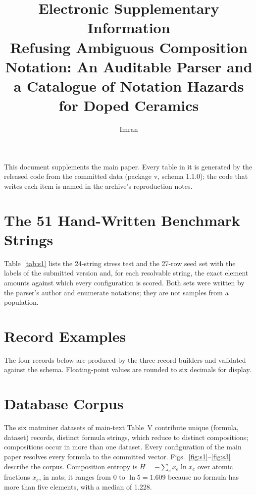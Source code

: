 \documentclass[10pt,a4paper]{article}
\title{Electronic Supplementary Information\\[4pt]\large Refusing Ambiguous Composition Notation: An Auditable Parser and a Catalogue of Notation Hazards for Doped Ceramics}
\author{Imran}
\date{}
\begin{document}
\maketitle

\noindent This document supplements the main paper. Every table in it is generated by the released code from the committed data (package v\ParserVersion, schema 1.1.0); the code that writes each item is named in the archive's reproduction notes.

\section{The 51 Hand-Written Benchmark Strings}
\label{sec:s1}
Table~\ref{tab:s1} lists the 24-string stress test and the 27-row seed set with the labels of the submitted version and, for each resolvable string, the exact element amounts against which every configuration is scored. Both sets were written by the parser's author and enumerate notations; they are not samples from a population.

{\footnotesize\setlength{\tabcolsep}{3pt}
}

\section{Record Examples}
\label{sec:s2}
The four records below are produced by the three record builders and validated against the schema. Floating-point values are rounded to six decimals for display.

{\footnotesize}

\section{Database Corpus}
\label{sec:s3}
The six matminer datasets of main-text Table~V contribute \NCorpus{} unique (formula, dataset) records, \NCorpusDistinct{} distinct formula strings, which reduce to \NCorpusReduced{} distinct compositions; \NCorpusCrossDataset{} compositions occur in more than one dataset. Every configuration of the main paper resolves every formula to the committed vector. Figs.~\ref{fig:s1}--\ref{fig:s3} describe the corpus. Composition entropy is $H=-\sum_e x_e\ln x_e$ over atomic fractions $x_e$, in nats; it ranges from 0 to $\ln 5=1.609$ because no formula has more than five elements, with a median of 1.228.
\end{document}
